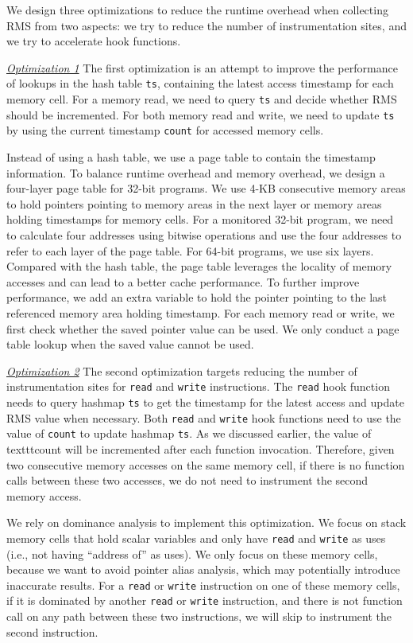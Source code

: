 We design three optimizations to reduce the runtime overhead when collecting RMS
from two aspects:
we try to reduce the number of instrumentation sites, 
and we try to accelerate hook functions. 

{\underline{\textit{Optimization 1}}
The first optimization is an attempt to improve the performance of 
lookups in the hash table \texttt{ts}, 
containing the latest access timestamp for each memory cell.
For a memory read, 
we need to query \texttt{ts} and decide 
whether RMS should be incremented.
For both memory read and write, 
we need to update \texttt{ts} by using the current timestamp \texttt{count}
for accessed memory cells. 

Instead of using a hash table, 
we use a page table to contain the timestamp information. 
To balance runtime overhead and memory overhead, 
we design a four-layer page table for 32-bit programs.
We use 4-KB consecutive memory areas to hold pointers pointing to 
memory areas in the next layer 
or memory areas holding timestamps for memory cells. 
For a monitored 32-bit program, 
we need to calculate four addresses using bitwise operations 
and use the four addresses to refer to each layer of the page table.  
For 64-bit programs, we use six layers.  
Compared with the hash table, 
the page table leverages the locality of memory accesses 
and can lead 
to a better cache performance. 
To further improve performance, 
we add an extra variable to hold the pointer pointing 
to the last referenced memory area holding timestamp.
For each memory read or write, 
we first check whether the saved pointer value can be used. 
We only conduct a page table lookup when the saved value cannot be used. 

{\underline{\textit{Optimization 2}}
The second optimization targets reducing the number of instrumentation sites 
for \texttt{read} and \texttt{write} instructions. 
The \texttt{read} hook function needs to query hashmap \texttt{ts} 
to get the timestamp for the latest access and update RMS value when necessary. 
Both \texttt{read} and \texttt{write} hook functions 
need to use the value of \texttt{count} to update hashmap \texttt{ts}.
As we discussed earlier, the value of texttt{count} will be incremented after each function invocation. 
Therefore, given two consecutive memory accesses on the same memory cell,
if there is no function calls between these two accesses, 
we do not need to instrument the second memory access. 

We rely on dominance analysis to implement this optimization. 
We focus on stack memory cells that hold 
scalar variables and only have \texttt{read} and \texttt{write} as uses 
(i.e., not having ``address of'' as uses).
We only focus on these memory cells,
because we want to avoid pointer alias analysis, 
which may potentially introduce inaccurate results. 
For a \texttt{read} or \texttt{write} instruction on one of these memory cells,
if it is dominated by another \texttt{read} or \texttt{write} instruction, 
and there is not function call on any path between these two instructions,
we will skip to instrument the second instruction.  





}}
